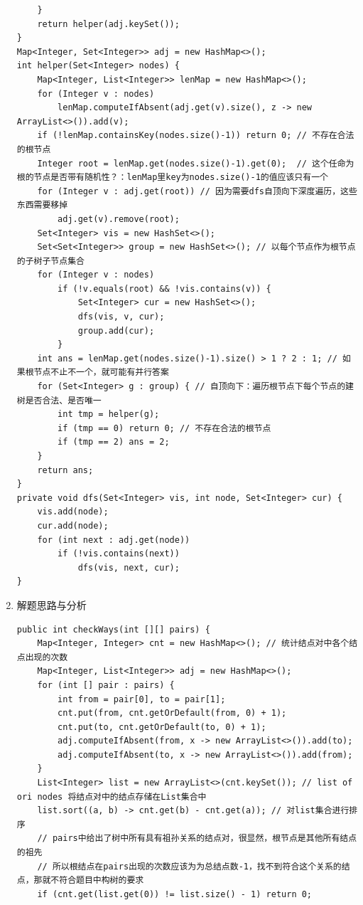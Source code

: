 \documentclass[9pt, b5paaper]{book}
\begin{document}
\begin{enumerate}
\begin{verbatim}
    }
    return helper(adj.keySet());
}
Map<Integer, Set<Integer>> adj = new HashMap<>();
int helper(Set<Integer> nodes) {
    Map<Integer, List<Integer>> lenMap = new HashMap<>();
    for (Integer v : nodes) 
        lenMap.computeIfAbsent(adj.get(v).size(), z -> new ArrayList<>()).add(v);
    if (!lenMap.containsKey(nodes.size()-1)) return 0; // 不存在合法的根节点
    Integer root = lenMap.get(nodes.size()-1).get(0);  // 这个任命为根的节点是否带有随机性？：lenMap里key为nodes.size()-1的值应该只有一个
    for (Integer v : adj.get(root)) // 因为需要dfs自顶向下深度遍历，这些东西需要移掉
        adj.get(v).remove(root);
    Set<Integer> vis = new HashSet<>();
    Set<Set<Integer>> group = new HashSet<>(); // 以每个节点作为根节点的子树子节点集合
    for (Integer v : nodes)
        if (!v.equals(root) && !vis.contains(v)) {
            Set<Integer> cur = new HashSet<>();
            dfs(vis, v, cur);
            group.add(cur);
        }
    int ans = lenMap.get(nodes.size()-1).size() > 1 ? 2 : 1; // 如果根节点不止不一个，就可能有并行答案
    for (Set<Integer> g : group) { // 自顶向下：遍历根节点下每个节点的建树是否合法、是否唯一
        int tmp = helper(g);
        if (tmp == 0) return 0; // 不存在合法的根节点
        if (tmp == 2) ans = 2;
    }
    return ans;
}
private void dfs(Set<Integer> vis, int node, Set<Integer> cur) {
    vis.add(node);
    cur.add(node);
    for (int next : adj.get(node)) 
        if (!vis.contains(next))
            dfs(vis, next, cur);
}
\end{verbatim}
\item 解题思路与分析
\label{sec-3-0-2-3}
\begin{verbatim}
public int checkWays(int [][] pairs) {
    Map<Integer, Integer> cnt = new HashMap<>(); // 统计结点对中各个结点出现的次数
    Map<Integer, List<Integer>> adj = new HashMap<>();
    for (int [] pair : pairs) {
        int from = pair[0], to = pair[1];
        cnt.put(from, cnt.getOrDefault(from, 0) + 1);
        cnt.put(to, cnt.getOrDefault(to, 0) + 1);
        adj.computeIfAbsent(from, x -> new ArrayList<>()).add(to);
        adj.computeIfAbsent(to, x -> new ArrayList<>()).add(from);
    }
    List<Integer> list = new ArrayList<>(cnt.keySet()); // list of ori nodes 将结点对中的结点存储在List集合中
    list.sort((a, b) -> cnt.get(b) - cnt.get(a)); // 对list集合进行排序
    // pairs中给出了树中所有具有祖孙关系的结点对，很显然，根节点是其他所有结点的祖先
    // 所以根结点在pairs出现的次数应该为为总结点数-1，找不到符合这个关系的结点，那就不符合题目中构树的要求
    if (cnt.get(list.get(0)) != list.size() - 1) return 0;

\end{verbatim}
\end{enumerate}
\end{document}

